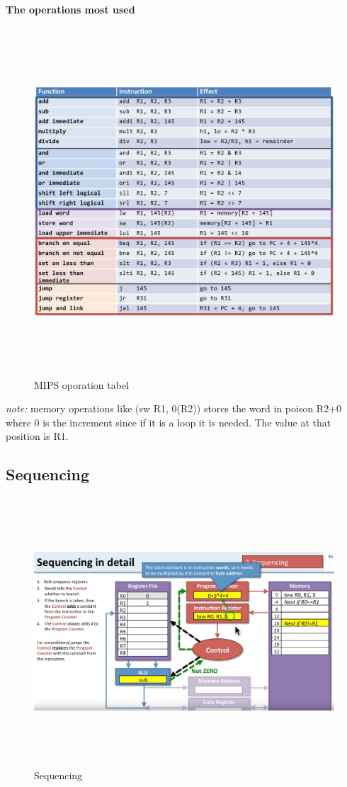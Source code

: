 \noindent\textbf{The operations most used} \newline
\begin{figure}[h]
    \vspace{10mm}
    \centering
    \includegraphics[width=16cm, height=13cm]{image/mips-tabel.png} 
    \caption{MIPS oporation tabel}
    \label{mips-tabel}
\end{figure}

\emph{note:} memory operations like (sw R1, 0(R2)) stores the word in poison R2+0 where 0 is the increment
since if it is a loop it is needed. The value at that position is R1. 

\newpage

\subsection{Sequencing}
\begin{figure}[h]
    \vspace{10mm}
    \centering
    \includegraphics[width=16cm, height=10cm]{image/sequencing.png} 
    \caption{Sequencing}
    \label{sequencing}
\end{figure}
\newpage

